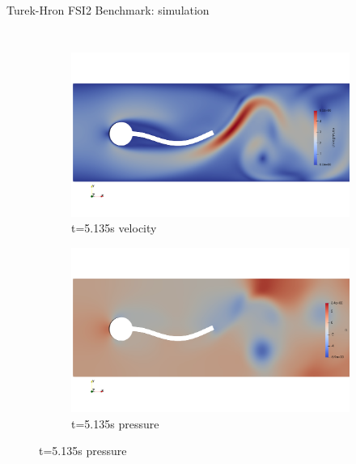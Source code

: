 \documentclass[10pt,t]{beamer}
\begin{document}
\begin{frame}{Turek-Hron FSI2 Benchmark: simulation}
\begin{columns}
\begin{figure}[htb]
\medskip

\begin{subfigure}{0.5\textwidth}
  \includegraphics[width=\linewidth, trim=0 120 0 120, clip]{images/FSI2/fsi2_v2.png}
  \caption{t=5.135s velocity}
  \label{fig:fsi2_v2}
\end{subfigure}\hfil %
\begin{subfigure}{0.5\textwidth}
  \includegraphics[width=\linewidth, trim=0 120 0 120, clip]{images/FSI2/fsi2_p2.png}
  \caption{t=5.135s pressure}
  \label{fig:fsi2_p2}
\end{subfigure}\hfil %

\medskip


\end{figure}
\end{columns}
\end{frame}
\end{document}
